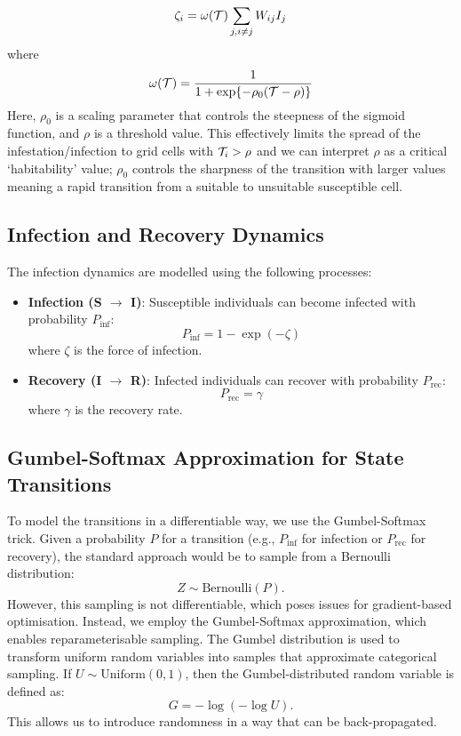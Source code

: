 \documentclass[12pt]{article}
\begin{document}
\[
\zeta_{i} ={\omega}({\cal T})  \sum_{j, i\ne j} W_{ij} I_j
\]
where 
\[
{\omega}({\cal T}) = \frac{1}{1 + \exp\{-\rho_0 ({\cal T}- \rho)\}}
\]
Here, $\rho_0$ is a scaling parameter that controls the steepness of the sigmoid function, and $\rho$ is a threshold value. This effectively limits the spread of the infestation/infection to grid cells with ${\cal T}_i>\rho$ and we can interpret $\rho$ as a critical `habitability' value; $\rho_0$ controls the sharpness of the transition with larger values meaning a rapid transition from a suitable to unsuitable susceptible cell.

\subsection{Infection and Recovery Dynamics}
The infection dynamics are modelled using the following processes:
\begin{itemize}
    \item \textbf{Infection (S $\to$ I)}: Susceptible individuals can become infected with probability $P_{\text{inf}}$:
    \[
    P_{\text{inf}} = 1 - \exp(-\zeta)
    \]
    where $\zeta$ is the force of infection.
    \item \textbf{Recovery (I $\to$ R)}: Infected individuals can recover with probability $P_{\text{rec}}$:
    \[
    P_{\text{rec}} = \gamma
    \]
    where $\gamma$ is the recovery rate.
\end{itemize}

\subsection{Gumbel-Softmax Approximation for State Transitions}

To model the transitions in a differentiable way, we use the Gumbel-Softmax trick. Given a probability \( P \) for a transition (e.g., \( P_{\text{inf}} \) for infection or \( P_{\text{rec}} \) for recovery), the standard approach would be to sample from a Bernoulli distribution:
\[
Z \sim \text{Bernoulli}(P).
\]
However, this sampling is not differentiable, which poses issues for gradient-based optimisation. Instead, we employ the Gumbel-Softmax approximation, which enables reparameterisable sampling. The Gumbel distribution is used to transform uniform random variables into samples that approximate categorical sampling. If \( U \sim \text{Uniform}(0,1) \), then the Gumbel-distributed random variable is defined as:
\[
G = -\log(-\log U).
\]
This allows us to introduce randomness in a way that can be back-propagated.
\end{document}
